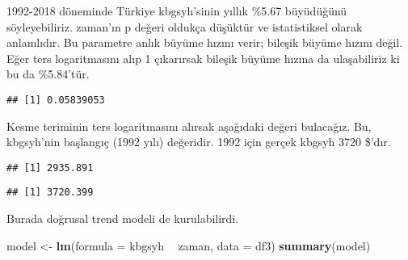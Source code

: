 \documentclass[
]{book}
\newenvironment{Shaded}{\begin{snugshade}}{\end{snugshade}}
\newcommand{\CommentTok}[1]{\textcolor[rgb]{0.56,0.35,0.01}{\textit{#1}}}
\newcommand{\DataTypeTok}[1]{\textcolor[rgb]{0.13,0.29,0.53}{#1}}
\newcommand{\DecValTok}[1]{\textcolor[rgb]{0.00,0.00,0.81}{#1}}
\newcommand{\KeywordTok}[1]{\textcolor[rgb]{0.13,0.29,0.53}{\textbf{#1}}}
\newcommand{\NormalTok}[1]{#1}
\newcommand{\OperatorTok}[1]{\textcolor[rgb]{0.81,0.36,0.00}{\textbf{#1}}}
\newcommand{\StringTok}[1]{\textcolor[rgb]{0.31,0.60,0.02}{#1}}
\begin{document}
1992-2018 döneminde Türkiye kbgsyh'sinin yıllık \%5.67 büyüdüğünü söyleyebiliriz. zaman'ın p değeri oldukça düşüktür ve istatistiksel olarak anlamlıdır. Bu parametre anlık büyüme hızını verir; bileşik büyüme hızını değil. Eğer ters logaritmasını alıp 1 çıkarırsak bileşik büyüme hızına da ulaşabiliriz ki bu da \%5.84'tür.

\begin{Shaded}
\end{Shaded}

\begin{verbatim}
## [1] 0.05839053
\end{verbatim}

Kesme teriminin ters logaritmasını alırsak aşağıdaki değeri bulacağız. Bu, kbgsyh'nin başlangıç (1992 yılı) değeridir. 1992 için gerçek kbgsyh 3720 \$'dır.

\begin{Shaded}
\end{Shaded}

\begin{verbatim}
## [1] 2935.891
\end{verbatim}

\begin{Shaded}
\end{Shaded}

\begin{verbatim}
## [1] 3720.399
\end{verbatim}

Burada doğrusal trend modeli de kurulabilirdi.

\begin{Shaded}
\begin{Highlighting}[]
\NormalTok{model <-}\StringTok{ }\KeywordTok{lm}\NormalTok{(}\DataTypeTok{formula =}\NormalTok{ kbgsyh }\OperatorTok{~}\StringTok{ }\NormalTok{zaman, }\DataTypeTok{data =}\NormalTok{ df3)}
\KeywordTok{summary}\NormalTok{(model)}
\end{Highlighting}
\end{Shaded}
\end{document}
